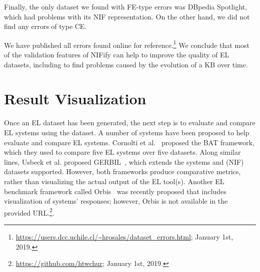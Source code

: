 \documentclass[sigconf]{acmart}
\begin{document}
Finally, the only dataset we found with FE-type errors was DBpedia Spotlight, which had problems with its NIF representation. On the other hand, we did not find any errors of type CE.

We have published all errors found online for reference.\footnote{\url{https://users.dcc.uchile.cl/~hrosales/dataset_errors.html}; January 1st, 2019.} We conclude that most of the validation features of NIFify can help to improve the quality of EL datasets, including to find problems caused by the evolution of a KB over time. 

\section{Result Visualization}


Once an EL dataset has been generated, the next step is to evaluate and compare EL systems using the dataset. A number of systems have been proposed to help evaluate and compare EL systems. Cornolti et al.~\cite{BAT2013} proposed the BAT framework, which they used to compare five EL systems over five datasets. Along similar lines, Usbeck et al. proposed GERBIL~\cite{gerbil-2015}, which extends the systems and (NIF) datasets supported. However, both frameworks produce comparative metrics, rather than visualizing the actual output of the EL tool(s). Another EL benchmark framework called Orbis~\cite{Orbis2018} was recently proposed that includes visualization of systems' responses; however, Orbis is not available in the provided URL.\footnote{\url{https://github.com/htwchur}; January 1st, 2019.}. 
\end{document}
